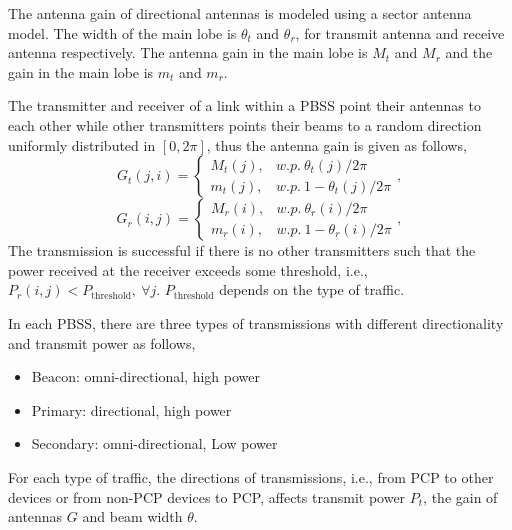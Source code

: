 \documentclass[10pt, conference, letterpaper]{IEEEtran}
\begin{document}
The antenna gain of directional antennas is modeled using a sector antenna model.%
The width of the main lobe is $\theta_t$ and $\theta_r$, for transmit antenna and receive antenna respectively. The antenna gain in the main lobe is $M_t$ and $M_r$ and the gain in the main lobe is $m_t$ and $m_r$.

The transmitter and receiver of a link within a PBSS point their antennas to each other while other transmitters points their beams to a random direction uniformly distributed in $[0, 2\pi]$, thus the antenna gain is given as follows,
\begin{equation*}
G_t(j,i) = 
\begin{cases}
M_t(j), & w.p. ~ \theta_t(j)/2\pi \\
m_t(j), & w.p. ~ 1-\theta_t(j)/2\pi
\end{cases},
\end{equation*}
\begin{equation*}
G_r(i,j) = 
\begin{cases}
M_r(i), & w.p. ~ \theta_r(i)/2\pi \\
m_r(i), & w.p. ~ 1-\theta_r(i)/2\pi
\end{cases},
\end{equation*}
The transmission is successful if there is no other transmitters such that the power received at the receiver exceeds some threshold, i.e., $P_r(i,j)< P_{\mathrm{threshold}}, ~ \forall j$. $P_{\mathrm{threshold}}$ depends on the type of traffic. 

In each PBSS, there are three types of transmissions with different directionality and transmit power as follows,
\begin{itemize}
	\item Beacon: omni-directional, high power
	\item Primary: directional, high power
	\item Secondary: omni-directional, Low power
\end{itemize}
For each type of traffic, the directions of transmissions, i.e., from PCP to other devices or from non-PCP devices to PCP, affects transmit power $P_t$, the gain of antennas $G$ and beam width $\theta$.

\end{document}
